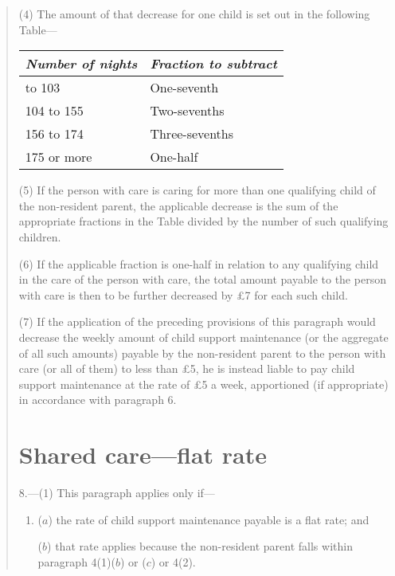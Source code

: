 \documentclass[12pt,a4paper]{article}
\begin{document}
\begin{quotation}
(4) The amount of that decrease for one child is set out in the following Table—

\medskip

{\footnotesize\noindent
\begin{longtable}{ll}
\hline
\itshape Number of nights	& \itshape Fraction to subtract\\
\hline
\endhead
\hline
\endlastfoot
52 to 103	&One-seventh\\
104 to 155	&Two-sevenths\\
156 to 174	&Three-sevenths\\
175 or more	&One-half\\
\end{longtable}

}

\medskip

(5) If the person with care is caring for more than one qualifying child of the non-resident parent, the applicable decrease is the sum of the appropriate fractions in the Table divided by the number of such qualifying children.

(6) If the applicable fraction is one-half in relation to any qualifying child in the care of the person with care, the total amount payable to the person with care is then to be further decreased by £7 for each such child.

(7) If the application of the preceding provisions of this paragraph would decrease the weekly amount of child support maintenance (or the aggregate of all such amounts) payable by the non-resident parent to the person with care (or all of them) to less than £5, he is instead liable to pay child support maintenance at the rate of £5 a week, apportioned (if appropriate) in accordance with paragraph 6. 

\section*{Shared care—flat rate}

8.---(1) This paragraph applies only if—
\begin{enumerate}\item[]
($a$) the rate of child support maintenance payable is a flat rate; and

($b$) that rate applies because the non-resident parent falls within paragraph 4(1)($b$)  or ($c$)  or 4(2).
\end{enumerate}


\end{quotation}
\end{document}
